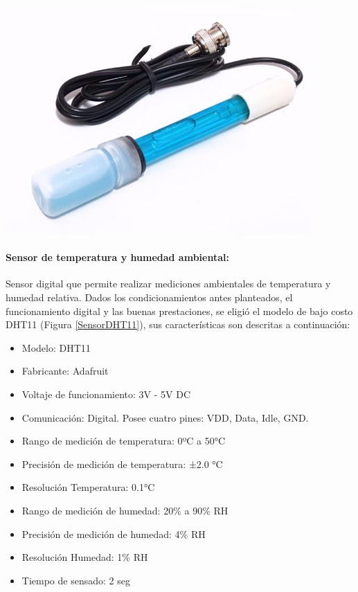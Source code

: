                 \begin{minipage}{0.95\textwidth}
                    \begin{center}
                    \includegraphics[scale=0.35]{hardware/electrododepH.jpg}
                    \label{phElectrode}
                    \end{center}
                \end{minipage}
                
            \paragraph{Sensor de temperatura y humedad ambiental:}Sensor digital que permite realizar mediciones ambientales de temperatura y humedad relativa. Dados los condicionamientos antes planteados, el funcionamiento digital y las buenas prestaciones, se eligió el modelo de bajo costo DHT11 (Figura \ref{SensorDHT11}), sus características son descritas a continuación:
                \begin{itemize}
                    \item Modelo: DHT11
                    \item Fabricante: Adafruit
                    \item Voltaje de funcionamiento: 3V - 5V DC
                    \item Comunicación: Digital. Posee cuatro pines: VDD, Data, Idle, GND.
                    \item Rango de medición de temperatura: 0ºC a 50°C
                    \item Precisión de medición de temperatura: ±2.0 °C
                    \item Resolución Temperatura: 0.1°C
                    \item Rango de medición de humedad: 20\% a 90\% RH
                    \item Precisión de medición de humedad: 4\% RH
                    \item Resolución Humedad: 1\% RH
                    \item Tiempo de sensado: 2 seg
                \end{itemize}
                
